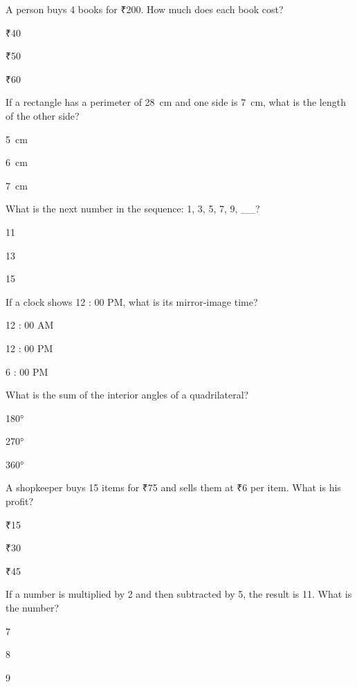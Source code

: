 \begin{enhancedmcq}{A person buys 4 books for ₹200. How much does each book cost?}
\item ₹40
\item ₹50
\item ₹60

\end{enhancedmcq}
\begin{enhancedmcq}{If a rectangle has a perimeter of 28 cm and one side is 7 cm, what is the length of the other side?}
\item 5 cm
\item 6 cm
\item 7 cm

\end{enhancedmcq}
\begin{enhancedmcq}{What is the next number in the sequence: 1, 3, 5, 7, 9, __?}
\item 11
\item 13
\item 15

\end{enhancedmcq}
\begin{enhancedmcq}{If a clock shows 12 : 00 PM, what is its mirror‑image time?}
\item 12 : 00 AM
\item 12 : 00 PM
\item 6 : 00 PM

\end{enhancedmcq}
\begin{enhancedmcq}{What is the sum of the interior angles of a quadrilateral?}
\item 180°
\item 270°
\item 360°

\end{enhancedmcq}
\begin{enhancedmcq}{A shopkeeper buys 15 items for ₹75 and sells them at ₹6 per item. What is his profit?}
\item ₹15
\item ₹30
\item ₹45

\end{enhancedmcq}
\begin{enhancedmcq}{If a number is multiplied by 2 and then subtracted by 5, the result is 11. What is the number?}
\item 7
\item 8
\item 9
\end{enhancedmcq}